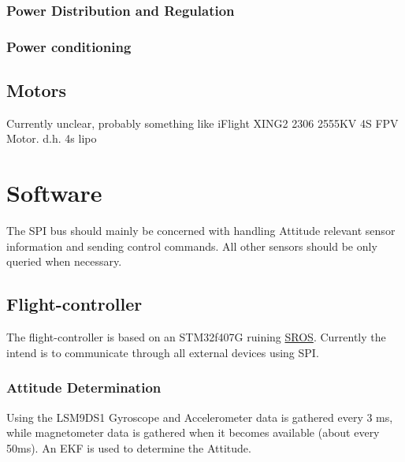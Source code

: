 \documentclass[10pt,a4paper]{article}
\begin{document}
\subsubsection*{Power Distribution and Regulation}

\subsubsection{Power conditioning}

\subsection*{Motors}
\label{motors}

Currently unclear, probably something like iFlight XING2 2306 2555KV 4S FPV Motor. 
d.h. 4s lipo



\section*{Software}
\label{sec:software}
The SPI bus should mainly be concerned with handling Attitude relevant sensor information and sending control commands.
All other sensors should be only queried when necessary.

\subsection*{Flight-controller}
The flight-controller is based on an STM32f407G ruining \href{https://github.com/kenscl/SROS}{SROS}.
Currently the intend is to communicate through all external devices using SPI.

\subsubsection*{Attitude Determination}
Using the LSM9DS1 Gyroscope and Accelerometer data is gathered every 3 ms, while magnetometer data is gathered when it becomes available (about every 50ms).
An EKF %
is used to determine the Attitude. 
\end{document}
